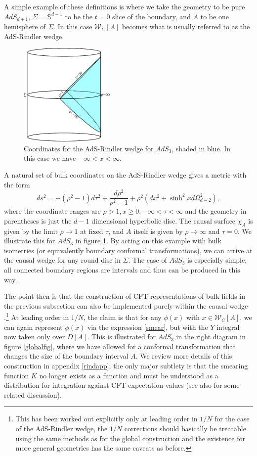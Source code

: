 \documentclass[11pt]{article}
\newcommand{\be}{\begin{equation}}
\newcommand{\ee}{\end{equation}}
\newcommand{\W}{\mathcal{W}}
\begin{document}
A simple example of these definitions is where we take the geometry to be pure $AdS_{d+1}$, $\Sigma=\mathbb{S}^{d-1}$ to be the $t=0$ slice of the boundary, and $A$ to be one hemisphere of $\Sigma$.  In this case $\W_C[A]$ becomes what is usually referred to as the AdS-Rindler wedge.   
\begin{figure}
\begin{center}
\includegraphics[height=5cm]{rindler.pdf}
\caption{Coordinates for the AdS-Rindler wedge for $AdS_3$, shaded in blue.  In this case we have $-\infty<x<\infty$.}\label{rindlerfig}
\end{center}
\end{figure}
A natural set of bulk coordinates on the AdS-Rindler wedge gives a metric with the form
\be
ds^2=-(\rho^2-1)d\tau^2+\frac{d\rho^2}{\rho^2-1}+\rho^2\left(dx^2+\sinh^2 x d\Omega_{d-2}^2\right),
\ee
where the coordinate ranges are $\rho>1, x\geq 0,-\infty<\tau<\infty$ and the geometry in parentheses is just the $d-1$ dimensional hyperbolic disc.  The causal surface $\chi_A$ is given by the limit $\rho \to 1$ at fixed $\tau$, and $A$ itself is given by $\rho\to \infty$ and $\tau=0$.  We illustrate this for $AdS_3$ in figure \ref{rindlerfig}.  By acting on this example with bulk isometries (or equivalently boundary conformal transformations), we can arrive at the causal wedge for any round disc in $\Sigma$.  The case of $AdS_3$ is especially simple; all connected boundary regions are intervals and thus can be produced in this way.  

The point then is that the construction of CFT representations of bulk fields in the previous subsection can also be implemented purely within the causal wedge \cite{Hamilton:2006az}.\footnote{This has been worked out explicitly only at leading order in $1/N$ for the case of the AdS-Rindler wedge, the $1/N$ corrections should basically be treatable using the same methods as for the global construction and the existence for more general geometries has the same caveats as before.} At leading order in $1/N$, the claim is that for any $\phi(x)$ with $x\in \W_C[A]$, we can again represent $\phi(x)$ via the expression \eqref{smear}, but with the $Y$ integral now taken only over $D[A]$.  This is illustrated for $AdS_3$ in the right diagram in figure \ref{globalfig}, where we have allowed for a conformal transformation that changes the size of the boundary interval $A$.  We review more details of this construction in appendix \ref{rindapp}; the only major subtlety is that the smearing function $K$ no longer exists as a function and must be understood as a distribution for integration against CFT expectation values \cite{Morrison:2014jha} (see also \cite{Papadodimas:2012aq} for some related discussion).  
\end{document}
